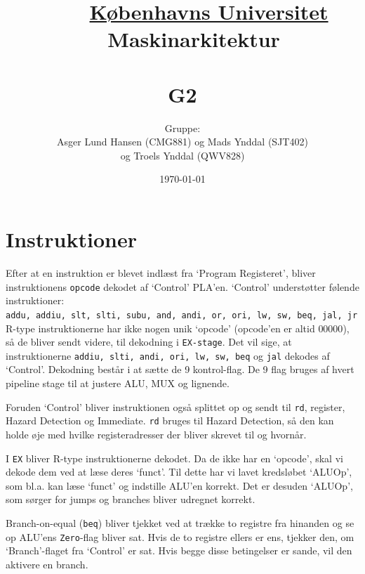 \documentclass[12pt, a4paper]{article}
\title{
  \vspace{-3em}
  {\Large \underline {Københavns Universitet}} \\
  {\Large Maskinarkitektur} \\ %
 \vspace{7em}
 \hrulefill \\
 { \huge \bfseries G2 \\[0.1cm] }
\hrulefill
}
\author{\Large {Gruppe:} \\ 
Asger Lund Hansen (CMG881) og Mads Ynddal (SJT402)\\ og Troels Ynddal (QWV828)
}
\date{
\vfill
\today
}
\begin{document}
\maketitle
\newpage

\section{Instruktioner}
Efter at en instruktion er blevet indlæst fra `Program Registeret', bliver instruktionens \texttt{opcode} dekodet af `Control' PLA'en. `Control' understøtter følende instruktioner:\\
\texttt{addu, addiu, slt, slti, subu, and, andi, or, ori, lw, sw, beq, jal, jr}\\

R-type instruktionerne har ikke nogen unik `opcode' (opcode'en er altid $00000$), så de bliver sendt videre, til dekodning i \texttt{EX-stage}.
Det vil sige, at instruktionerne \texttt{addiu, slti, andi, ori, lw, sw, beq} og \texttt{jal} dekodes af `Control'. Dekodning består i at sætte de 9 kontrol-flag. De 9 flag bruges af hvert pipeline stage til at justere ALU, MUX og lignende. 

Foruden `Control' bliver instruktionen også splittet op og sendt til \texttt{rd}, register, Hazard Detection og Immediate. \texttt{rd} bruges til Hazard Detection, så den kan holde øje med hvilke registeradresser der bliver skrevet til og hvornår.

I \texttt{EX} bliver R-type instruktionerne dekodet. Da de ikke har en `opcode', skal vi dekode dem ved at læse deres `funct'. Til dette har vi lavet kredsløbet `ALUOp', som bl.a. kan læse `funct' og indstille ALU'en korrekt. Det er desuden `ALUOp', som sørger for jumps og branches bliver udregnet korrekt.

Branch-on-equal (\texttt{beq}) bliver tjekket ved at trække to registre fra hinanden og se op ALU'ens \texttt{Zero}-flag bliver sat. Hvis de to registre ellers er ens, tjekker den, om `Branch'-flaget fra `Control' er sat. Hvis begge disse betingelser er sande, vil den aktivere en branch.
\end{document}
